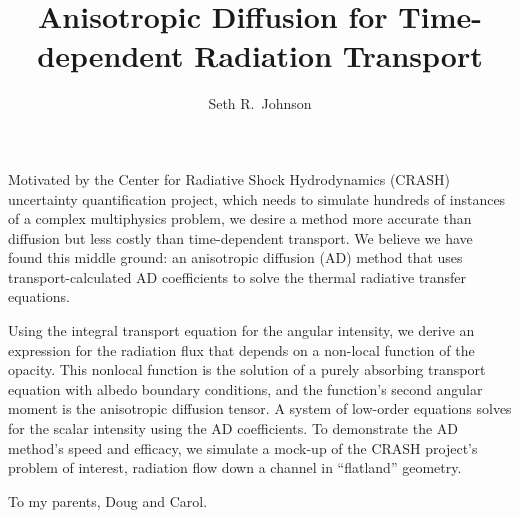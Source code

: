 \documentclass[12pt, letterpaper, draft]{umthesis}
\author{Seth R.~Johnson}
\title{Anisotropic Diffusion for Time-dependent Radiation Transport}
\begin{document}
\frontmatter

\maketitle

\begin{finalabstract}
Motivated by the Center for Radiative Shock Hydrodynamics (CRASH) uncertainty
quantification project, which needs to simulate hundreds of instances of a
complex multiphysics problem, we desire a method more accurate than diffusion
but less costly than time-dependent transport. We believe we have found this
middle ground: an anisotropic diffusion (AD) method that uses
transport-calculated AD coefficients to solve the thermal radiative transfer
equations.

Using the integral transport equation for the angular intensity, we derive an
expression for the radiation flux that depends on a non-local function of the
opacity. This nonlocal function is the solution of a purely absorbing transport
equation with albedo boundary conditions, and the function's second angular
moment is the anisotropic diffusion tensor. A system of low-order equations
solves for the scalar intensity using the AD coefficients. To demonstrate the
AD method's speed and efficacy, we simulate a mock-up of the CRASH project's
problem of interest, radiation flow down a channel in ``flatland'' geometry.

\end{finalabstract}
\makecopyright


\begin{dedication}
  To my parents, Doug and Carol.
\end{dedication}
\end{document}
